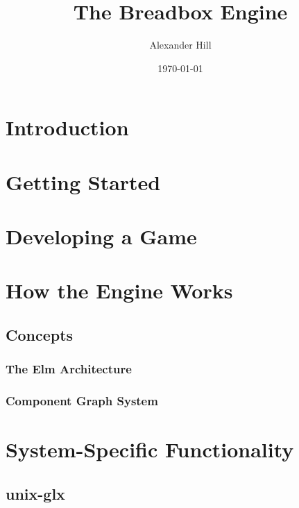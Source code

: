 \documentclass{article}
\title{The Breadbox Engine}
\author{Alexander Hill}
\date{\today}
\begin{document}
    \maketitle
    \section{Introduction}
    \section{Getting Started}
    \section{Developing a Game}
    \section{How the Engine Works}
    \subsection{Concepts}
    \subsubsection{The Elm Architecture}
    \subsubsection{Component Graph System}
    \section{System-Specific Functionality}
    \subsection{unix-glx}
\end{document}
